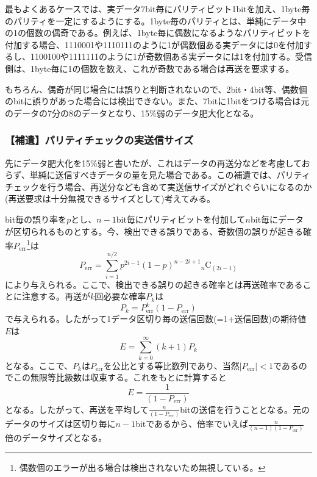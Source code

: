 最もよくあるケースでは、実データ7bit毎にパリティビット1bitを加え、1byte毎のパリティを一定にするようにする。1byte毎のパリティとは、単純にデータ中の1の個数の偶奇である。例えば、1byte毎に偶数になるようなパリティビットを付加する場合、1110001や1110111のように1が偶数個ある実データには0を付加するし、1100100や1111111のように1が奇数個ある実データには1を付加する。受信側は、1byte毎に1の個数を数え、これが奇数である場合は再送を要求する。

もちろん、偶奇が同じ場合には誤りと判断されないので、2bit・4bit等、偶数個のbitに誤りがあった場合には検出できない。また、7bitに1bitをつける場合は元のデータの7分の8のデータとなり、15\%弱のデータ肥大化となる。

\subsubsection{【補遺】パリティチェックの実送信サイズ}
先にデータ肥大化を15\%弱と書いたが、これはデータの再送分などを考慮しておらず、単純に送信すべきデータの量を見た場合である。この補遺では、パリティチェックを行う場合、再送分なども含めて実送信サイズがどれぐらいになるのか(再送要求は十分無視できるサイズとして)考えてみる。

bit毎の誤り率を$p$とし、$n-1$bit毎にパリティビットを付加して$n$bit毎にデータが区切られるものとする。今、検出できる誤りである、奇数個の誤りが起きる確率$P_\mathrm{err}$\footnote{偶数個のエラーが出る場合は検出されないため無視している。}は
\begin{equation}
P_\mathrm{err}=\sum^{n/2}_{i=1} p^{2i-1} (1-p)^{n-2i+1} {}_n\mathrm{C}_{(2i-1)}
\end{equation}
により与えられる。ここで、検出できる誤りの起きる確率とは再送確率であることに注意する。再送が$k$回必要な確率$P_k$は
\begin{equation}
P_k = P_\mathrm{err}^{k} (1-P_\mathrm{err})
\end{equation}
で与えられる。したがって1データ区切り毎の送信回数(=1+送信回数)の期待値$E$は
\begin{equation}
E=\sum^{\infty}_{k=0} (k+1)P_k
\end{equation}
となる。ここで、$P_k$は$P_\mathrm{err}$を公比とする等比数列であり、当然$|P_\mathrm{err}|<1$であるのでこの無限等比級数は収束する。これをもとに計算すると
\begin{equation}
E=\frac{1}{(1-P_\mathrm{err})}
\end{equation}
となる。したがって、再送を平均して$\frac{n}{(1-P_\mathrm{err})}$bitの送信を行うこととなる。元のデータのサイズは区切り毎に$n-1$bitであるから、倍率でいえば$\frac{n}{(n-1)(1-P_\mathrm{err})}$倍のデータサイズとなる。

